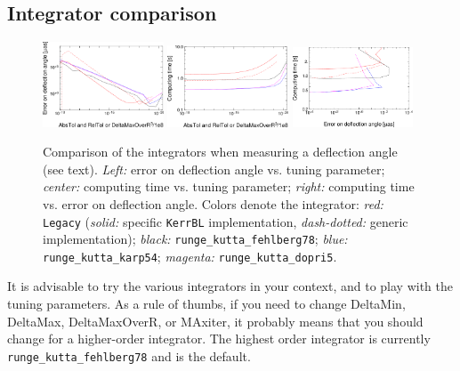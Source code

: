 \documentclass[a4paper,12pt]{article}
\begin{document}
\subsection{Integrator comparison}

\begin{figure}
  \includegraphics[width=0.32\textwidth]{doc-fig-dfl-tol.pdf}
  \includegraphics[width=0.32\textwidth]{doc-fig-ctime-tol.pdf}
  \includegraphics[width=0.32\textwidth]{doc-fig-dfl-ctime.pdf}
  \caption{Comparison of the integrators when measuring a deflection
    angle (see text). \emph{Left:} error on deflection angle
    vs. tuning parameter; \emph{center:} computing time vs. tuning
    parameter; \emph{right:} computing time vs. error on deflection
    angle. Colors denote the integrator: \emph{red:} \texttt{Legacy}
    (\emph{solid:} specific \texttt{KerrBL} implementation,
    \emph{dash-dotted:} generic implementation); \emph{black:}
    \texttt{runge\_kutta\_fehlberg78}; \emph{blue:}
    \texttt{runge\_kutta\_karp54}; \emph{magenta:}
    \texttt{runge\_kutta\_dopri5}.}
\label{fig:integrators}
\end{figure}

It is advisable to try the various integrators in your context, and to
play with the tuning parameters. As a rule of thumbs, if you need to
change DeltaMin, DeltaMax, DeltaMaxOverR, or MAxiter, it probably
means that you should change for a higher-order integrator. The
highest order integrator is currently
\texttt{runge\_kutta\_fehlberg78} and is the default.
\end{document}
